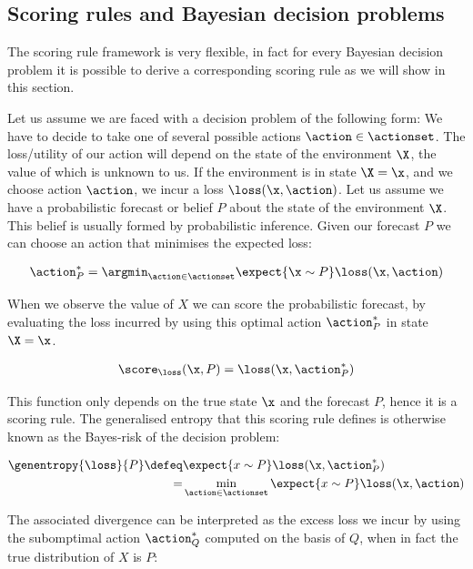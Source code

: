 \subsection{Scoring rules and Bayesian decision problems}

The scoring rule framework is very flexible, in fact for every Bayesian decision problem it is possible to derive a corresponding scoring rule as we will show in this section.

Let us assume we are faced with a decision problem of the following form: We have to decide to take one of several possible actions $\action\in\actionset$. The loss/utility of our action will depend on the state of the environment $\X$, the value of which is unknown to us. If the environment is in state $\X=\x$, and we choose action $\action$, we incur a loss $\loss(\x,\action)$.
Let us assume we have a probabilistic forecast or belief $P$ about the state of the environment $\X$. This belief is usually formed by probabilistic inference. Given our forecast $P$ we can choose an action that minimises the expected loss:

\begin{align}
	\action^{*}_{P} = \argmin_{\action\in\actionset} \expect{\x \sim P} \loss(\x,\action)
\end{align}

When we observe the value of $X$ we can score the probabilistic forecast, by evaluating the loss incurred by using this optimal action $\action^{*}_{P}$ in state $\X=\x$.

\begin{align}
	\score_{\loss}(\x,P) = \loss(\x,\action^{*}_{P})
\end{align}

This function only depends on the true state $\x$ and the forecast $P$, hence it is a scoring rule. The generalised entropy that this scoring rule defines is otherwise known as the Bayes-risk of the decision problem:

\begin{align}
	\genentropy{\loss}{P} \defeq &\expect{x\sim P} \loss(\x,\action^{*}_{P})\\
		= &\min_{\action\in\actionset} \expect{x\sim P} \loss(\x,\action)
\end{align}

The associated divergence can be interpreted as the excess loss we incur by using the subomptimal action $\action^{*}_{Q}$ computed on the basis of $Q$, when in fact the true distribution of $X$ is $P$:

